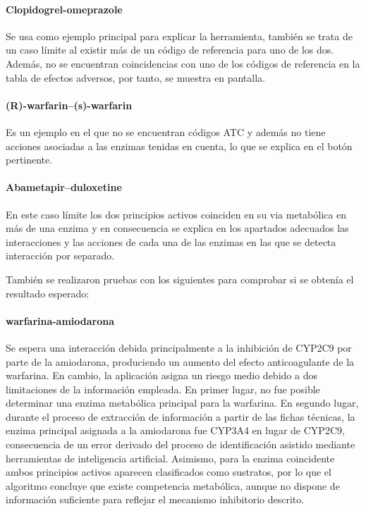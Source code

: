 \paragraph{Clopidogrel-omeprazole} Se usa como ejemplo principal para explicar la herramienta, también se trata de un caso límite al existir más de un código de referencia para uno de los dos. Además, no se encuentran coincidencias con uno de los códigos de referencia en la tabla de efectos adversos, por tanto, se muestra en pantalla.
\paragraph{(R)-warfarin–(s)-warfarin} Es un ejemplo en el que no se encuentran códigos ATC y además no tiene acciones asociadas a las enzimas tenidas en cuenta, lo que se explica en el botón pertinente.
\paragraph{Abametapir–duloxetine} En este caso límite los dos principios activos coinciden en su via metabólica en más de una enzima y en consecuencia se explica en los apartados adecuados las interacciones y las acciones de cada una de las enzimas en las que se detecta interacción por separado.

También se realizaron pruebas con los siguientes para comprobar si se obtenía el resultado esperado:
\paragraph{warfarina-amiodarona} Se espera una interacción debida principalmente a la inhibición de CYP2C9 por parte de la amiodarona, produciendo un aumento del efecto anticoagulante de la warfarina. En cambio, la aplicación asigna un riesgo medio debido a dos limitaciones de la información empleada. En primer lugar, no fue posible determinar una enzima metabólica principal para la warfarina. En segundo lugar, durante el proceso de extracción de información a partir de las fichas técnicas, la enzima principal asignada a la amiodarona fue CYP3A4 en lugar de CYP2C9, consecuencia de un error derivado del proceso de identificación asistido mediante herramientas de inteligencia artificial. Asimismo, para la enzima coincidente ambos principios activos aparecen clasificados como sustratos, por lo que el algoritmo concluye que existe competencia metabólica, aunque no dispone de información suficiente para reflejar el mecanismo inhibitorio descrito.
